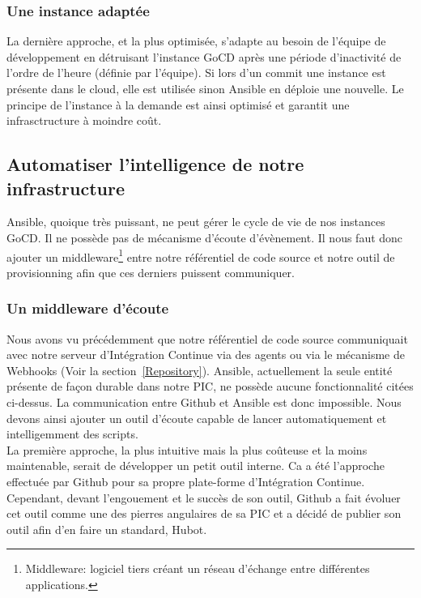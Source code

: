           \subsubsection{Une instance adaptée}
          La dernière approche, et la plus optimisée, s'adapte au besoin de l'équipe de développement en détruisant l'instance GoCD après une période d'inactivité de l'ordre de l'heure (définie par l'équipe). Si lors d'un commit une instance est présente dans le cloud, elle est utilisée sinon Ansible en déploie une nouvelle. Le principe de l'instance à la demande est ainsi optimisé et garantit une infrasctructure à moindre coût.

        \subsection{Automatiser l'intelligence de notre infrastructure}
        Ansible, quoique très puissant, ne peut gérer le cycle de vie de nos instances GoCD. Il ne possède pas de mécanisme d'écoute d'évènement. Il nous faut donc ajouter un \gls{middleware}\footnote{Middleware: logiciel tiers créant un réseau d'échange entre différentes applications.} entre notre référentiel de code source et notre outil de provisionning afin que ces derniers puissent communiquer.\\


          \subsubsection{Un middleware d'écoute}
          Nous avons vu précédemment que notre référentiel de code source communiquait avec notre serveur d'Intégration Continue via des agents ou via le mécanisme de Webhooks (Voir la section~\ref{Repository}). Ansible, actuellement la seule entité présente de façon durable dans notre PIC, ne possède aucune fonctionnalité citées ci-dessus. La communication entre Github et Ansible est donc impossible. Nous devons ainsi ajouter un outil d'écoute capable de lancer automatiquement et intelligemment des scripts.\\

          La première approche, la plus intuitive mais la plus coûteuse et la moins maintenable, serait de développer un petit outil interne. Ca a été l'approche effectuée par Github pour sa propre plate-forme d'Intégration Continue. Cependant, devant l'engouement et le succès de son outil, Github a fait évoluer cet outil comme une des pierres angulaires de sa PIC et a décidé de publier son outil afin d'en faire un standard, Hubot.

